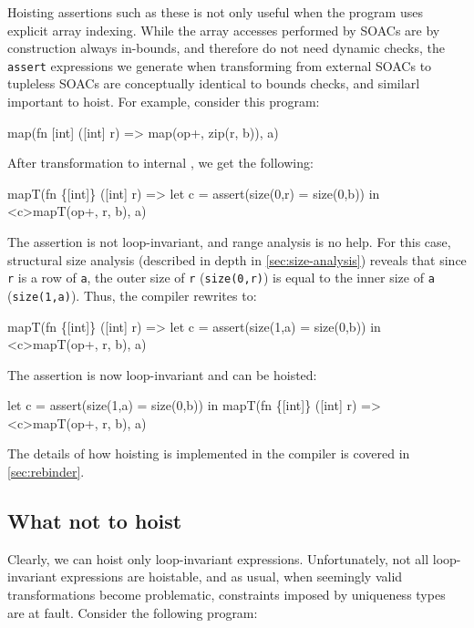 Hoisting assertions such as these is not only useful when the program
uses explicit array indexing.  While the array accesses performed by
SOACs are by construction always in-bounds, and therefore do not need
dynamic checks, the \texttt{assert} expressions we generate when
transforming from external SOACs to tupleless SOACs are conceptually
identical to bounds checks, and similarl important to hoist.  For
example, consider this program:

\begin{colorcode}
map(fn [int] ([int] r) =>
      map(op+, zip(r, b)),
    a)
\end{colorcode}

After transformation to internal \LO{}, we get the following:

\begin{colorcode}
mapT(fn \{[int]\} ([int] r) =>
       let c = assert(size(0,r) = size(0,b)) in
       <c>mapT(op+, r, b),
    a)
\end{colorcode}

The assertion is not loop-invariant, and range analysis is no help.
For this case, structural size analysis (described in depth in
\cref{sec:size-analysis}) reveals that since \texttt{r} is a row of
\texttt{a}, the outer size of \texttt{r} (\texttt{size(0,r)}) is equal
to the inner size of \texttt{a} (\texttt{size(1,a)}).  Thus, the
compiler rewrites to:

\begin{colorcode}
mapT(fn \{[int]\} ([int] r) =>
       let c = assert(size(1,a) = size(0,b)) in
       <c>mapT(op+, r, b),
    a)
\end{colorcode}

The assertion is now loop-invariant and can be hoisted:

\begin{colorcode}
let c = assert(size(1,a) = size(0,b)) in
mapT(fn \{[int]\} ([int] r) =>
       <c>mapT(op+, r, b),
    a)
\end{colorcode}

The details of how hoisting is implemented in the \LO{} compiler is
covered in \cref{sec:rebinder}.

\subsection{What not to hoist}
\label{sec:when-not-to-hoist}

Clearly, we can hoist only loop-invariant expressions.  Unfortunately,
not all loop-invariant expressions are hoistable, and as usual, when
seemingly valid transformations become problematic, constraints
imposed by uniqueness types are at fault.  Consider the following
program:

